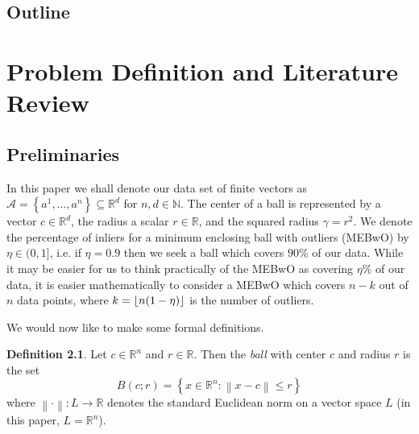 \documentclass[11pt,twoside]{report}
\newcommand{\norm}[1]{\left\lVert#1\right\rVert} %
\DeclarePairedDelimiter\floor{\lfloor}{\rfloor}
\theoremstyle{definition}
\newtheorem{definition}{Definition}
\numberwithin{theorem}{section}
\numberwithin{definition}{section}
\numberwithin{lemma}{section}
\numberwithin{proposition}{section}
\numberwithin{equation}{section}
\numberwithin{figure}{section}
\begin{document}
%
%
%   
\section{Outline}


\chapter{Problem Definition and Literature Review}\label{exact}
\section{Preliminaries}
In this paper we shall denote our data set of finite vectors as $\mathcal{A} = \left\{a^1,\ldots,a^n\right\}\subseteq\mathbb{R}^d$ for $n,d\in\mathbb{N}$. The center of a ball is represented by a vector $c\in\mathbb{R}^d$, the radius a scalar $r\in\mathbb{R}$, and the squared radius $\gamma=r^2$. We denote the percentage of inliers for a minimum enclosing ball with outliers (MEBwO) by $\eta\in(0,1]$, i.e. if $\eta=0.9$ then we seek a ball which covers $90\%$ of our data. While it may be easier for us to think practically of the MEBwO as covering $\eta\%$ of our data, it is easier mathematically to consider a MEBwO which covers $n-k$ out of $n$ data points, where $k=\floor{n(1-\eta)}$ is the number of outliers.

We would now like to make some formal definitions.

\begin{definition}
    Let $c\in\mathbb{R}^n$ and $r\in\mathbb{R}$. Then the \textit{ball} with center $c$ and radius $r$ is the set
    \begin{equation*}
        B(c;r) = \left\{x\in\mathbb{R}^n : \norm{x-c} \leq r\right\}
    \end{equation*}
    where $\norm{\cdot}:L\to\mathbb{R}$ denotes the standard Euclidean norm on a vector space $L$ (in this paper, $L=\mathbb{R}^n$).
\end{definition}
\end{document}
